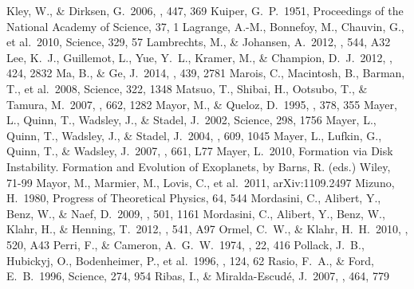 \documentclass[twocolumn, dvipdfmx]{aastex62}
\begin{document}
\begin{CJK*}{UTF8}{min}
\begin{thebibliography}{}
 Kley, W., \& Dirksen, G.\ 2006, \aap, 447, 369
 Kuiper, G.~P.\ 1951, Proceedings of the National Academy of Science, 37, 1
 Lagrange, A.-M., Bonnefoy, M., Chauvin, G., et al.\ 2010, Science, 329, 57
 Lambrechts, M., \& Johansen, A.\ 2012, \aap, 544, A32
 Lee, K.~J., Guillemot, L., Yue, Y.~L., Kramer, M., \& Champion, D.~J.\ 2012, \mnras, 424, 2832
 Ma, B., \& Ge, J.\ 2014, \mnras, 439, 2781
 Marois, C., Macintosh, B., Barman, T., et al.\ 2008, Science, 322, 1348
 Matsuo, T., Shibai, H., Ootsubo, T., \& Tamura, M.\ 2007, \apj, 662, 1282
 Mayor, M., \& Queloz, D.\ 1995, \nat, 378, 355
 Mayer, L., Quinn, T., Wadsley, J., \& Stadel, J.\ 2002, Science, 298, 1756
 Mayer, L., Quinn, T., Wadsley, J., \& Stadel, J.\ 2004, \apj, 609, 1045
 Mayer, L., Lufkin, G., Quinn, T., \& Wadsley, J.\ 2007, \apjl, 661, L77
 Mayer, L.\ 2010, Formation via Disk Instability. Formation and Evolution of Exoplanets, by Barns, R. (eds.) Wiley, 71-99
 Mayor, M., Marmier, M., Lovis, C., et al.\ 2011, arXiv:1109.2497
 Mizuno, H.\ 1980, Progress of Theoretical Physics, 64, 544
 Mordasini, C., Alibert, Y., Benz, W., \& Naef, D.\ 2009, \aap, 501, 1161
 Mordasini, C., Alibert, Y., Benz, W., Klahr, H., \& Henning, T.\ 2012, \aap, 541, A97
 Ormel, C.~W., \& Klahr, H.~H.\ 2010, \aap, 520, A43
 Perri, F., \& Cameron, A.~G.~W.\ 1974, \icarus, 22, 416
 Pollack, J.~B., Hubickyj, O., Bodenheimer, P., et al.\ 1996, \icarus, 124, 62
 Rasio, F.~A., \& Ford, E.~B.\ 1996, Science, 274, 954
 Ribas, I., \& Miralda-Escud{\'e}, J.\ 2007, \aap, 464, 779

\end{thebibliography}
\end{CJK*}
\end{document}
